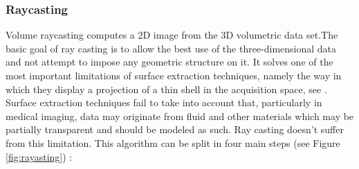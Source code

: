 \subsubsection{Raycasting}
Volume raycasting computes a 2D image from the 3D volumetric data set.The basic goal of ray casting is to allow the best use of the three-dimensional data and not attempt to impose any geometric structure on it. It solves one of the most important limitations of surface extraction techniques, namely the way in which they display a projection of a thin shell in the acquisition space, see \cite{Stegmaier:2005:SFV:2386472.2386498}. Surface extraction techniques fail to take into account that, particularly in medical imaging, data may originate from fluid and other materials which may be partially transparent and should be modeled as such. Ray casting doesn't suffer from this limitation. This algorithm can be split in four main steps (see Figure \ref{fig:rayasting}) :
